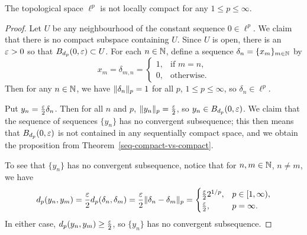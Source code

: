 \begin{prop}
  The topological space $\ell^p$ is not locally compact for any $1 \leq p \leq \infty$.
\end{prop}
\begin{proof}
  Let $U$ be any neighbourhood of the constant sequence $0 \in \ell^p$. We claim that there is no compact subspace containing $U$. Since $U$ is open, there is an $\varepsilon > 0$ so that $B_{d_p}(0,\varepsilon) \subset U$. For each $n \in \mathbb{N}$, define a sequence $\delta_n = \{ x_m\}_{m\in \mathbb{N}}$ by
  \[
    x_m = \delta_{m,n} = \begin{cases} 1, & \text{if $m = n$}, \\0, &\text{otherwise.} \end{cases}
  \]
  Then for any $n \in \mathbb{N}$, we have $\lVert \delta_n \rVert_p = 1$ for all $p$, $1 \leq p \leq \infty$, so $\delta_n \in \ell^p$.
  
  Put $y_n = \tfrac{\varepsilon}{2} \delta_n$. Then for all $n$ and $p$, $\lVert y_n \rVert_p = \tfrac{\varepsilon}{2}$, so $y_n \in B_{d_p}(0,\varepsilon)$. We claim that the sequence of sequences $\{y_n\}$ has no convergent subsequence; this then means that $B_{d_p}(0,\varepsilon)$ is not contained in any sequentially compact space, and we obtain the proposition from Theorem~\ref{seq-compact-vs-compact}.
  
  To see that $\{y_n\}$ has no convergent subsequence, notice that for $n, m \in \mathbb{N}$, $n \not= m$, we have
  \[
    d_p(y_n,y_m) = \frac{\varepsilon}{2} d_p(\delta_n,\delta_m) = \frac{\varepsilon}{2} \lVert \delta_n-\delta_m \rVert_p = \begin{cases} \tfrac{\varepsilon}{2} 2^{1/p}, & p \in [1,\infty), \\ \tfrac{\varepsilon}{2}, & p = \infty. \end{cases}
  \]
  In either case, $d_p(y_n,y_m) \geq \tfrac{\varepsilon}{2}$, so $\{y_n\}$ has no convergent subsequence.
\end{proof}
